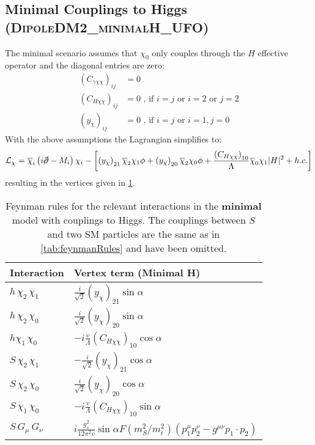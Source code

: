 \documentclass[a4paper,11pt]{article}
\begin{document}
\newpage
\clearpage
\subsection{Minimal Couplings to Higgs (\textsc{\small DipoleDM2\_minimalH\_UFO})}

The minimal scenario assumes that $\chi_0$ only couples through the $H$ effective operator and the diagonal entries are zero:
\begin{align}
	(C_{\gamma\chi\chi})_{ij} &= 0\\
	(C_{H\chi\chi})_{ij} &= 0 \mbox{ , if $i = j$ or $i = 2$ or $j=2$} \\
	(y_{\chi})_{ij} & = 0 \mbox{ , if $i = j$ or $i =1, j = 0$ }
\end{align}
With the above assumptions the Lagrangian simplifies to:
\begin{align}
	\mathcal{L}_{\chi} = \overline{\chi}_i \left( i \cancel \partial- M_{i} \right) \chi_i - \left[\left(y_\chi\right)_{21} \overline{\chi}_2 \chi_1 \phi + \left(y_\chi\right)_{20} \overline{\chi}_2 \chi_0 \phi + \frac{\left(C_{H \chi \chi}\right)_{10}}{\Lambda} \overline{\chi}_0 \chi_1 |H|^2  + h.c.\right] 
\end{align}
resulting in the vertices given in \cref{tab:feynmanRulesH}.

\begin{table}[h!]   \centering
	\vspace{0.2cm}
	\begin{tabular}{p{2cm}|p{8.5cm}}
		\toprule
		\textbf{Interaction} & \textbf{Vertex term (Minimal H)}\\ \toprule 
		$h\, \chi_2\,\chi_1$ & $\frac{i}{\sqrt{2}} (y_{\chi})_{21} \sin\alpha$\\
		$h\, \chi_2\,\chi_0$ & $\frac{i}{\sqrt{2}} (y_{\chi})_{20} \sin\alpha$\\
		$h\chi_1\,\chi_0$  & $-i \frac{v}{\Lambda} (C_{H\chi\chi})_{10} \cos\alpha$\\		
		$S\,\chi_2\,\chi_1$  & $-\frac{i}{\sqrt{2}} (y_{\chi})_{21} \cos\alpha $\\
		$S\,\chi_2\,\chi_0$ &  $\frac{i}{\sqrt{2}} (y_{\chi})_{20} \cos\alpha$\\
		$S\,\chi_1\,\chi_0$ &  $-i \frac{v}{\Lambda} (C_{H\chi\chi})_{10} \sin\alpha$\\
    	$S\,G_\mu\,G_\nu$  & $i \frac{g_s^2}{12 \pi^2 v} \sin\alpha F(m^2_S/m^2_t) (p_1^\mu p_2^\nu - g^{\mu\nu} p_1\cdot p_2) $\\
		\bottomrule        
	\end{tabular}
	\caption{Feynman rules for the relevant interactions in the {\bf minimal} model with couplings to Higgs. The couplings between $S$ and two SM particles are the same as in \cref{tab:feynmanRules} and have been omitted. \label{tab:feynmanRulesH}}
\end{table}
\end{document}
